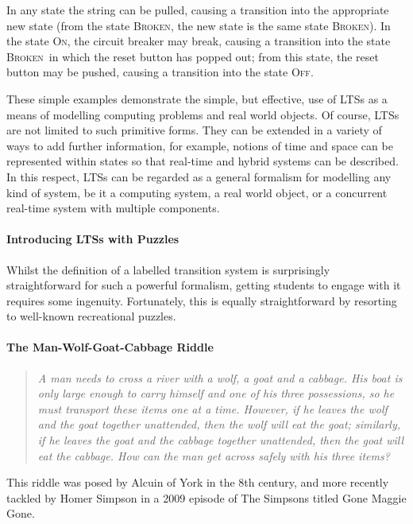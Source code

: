 \documentclass[sigconf]{acmart}
\newcommand{\OFF}{\textsc{ Off}}
\newcommand{\ON}{\textsc{ On}}
\newcommand{\BROKEN}{\textsc{ Broken}}
\begin{document}
In any state the string can be pulled, causing a transition into the
appropriate new state (from the state \BROKEN, the new state is the
same state \BROKEN).  In the state \ON, the circuit breaker may break,
causing a transition into the state \BROKEN\ in which the reset button
has popped out; from this state, the reset button may be pushed,
causing a transition into the state \OFF.

These simple examples demonstrate the simple, but effective, use of
LTSs as a means of modelling computing problems and real world
objects.  Of course, LTSs are not limited to such primitive forms.
They can be extended in a variety of ways to add further information,
for example, notions of time and space can be represented within
states so that real-time and hybrid systems can be described.  In this
respect, LTSs can be regarded as a general formalism for modelling any
kind of system, be it a computing system, a real world object, or a
concurrent real-time system with multiple components.

\paragraph{Introducing LTSs with Puzzles}
\newblock

Whilst the definition of a labelled transition system is surprisingly
straightforward for such a powerful formalism, getting students to
engage with it requires some ingenuity.  Fortunately, this is equally
straightforward by resorting to well-known recreational puzzles.

\paragraph{The Man-Wolf-Goat-Cabbage Riddle}
\newblock

\begin{quote}
\emph{A man needs to cross a river with a wolf, a goat and a cabbage.
His boat is only large enough to carry himself and one of his three
possessions, so he must transport these items one at a time.  However,
if he leaves the wolf and the goat together unattended, then the wolf
will eat the goat; similarly, if he leaves the goat and the cabbage
together unattended, then the goat will eat the cabbage.  How can the
man get across safely with his three items?}
\end{quote}

This riddle was posed by Alcuin of York in the 8th century, and more
recently tackled by Homer Simpson in a 2009 episode of The Simpsons
titled Gone Maggie Gone.
\end{document}
